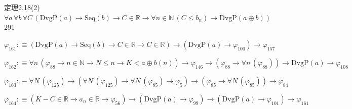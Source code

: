 \begin{fullproof}{定理2.18(2)}{$\forall a\,\forall b\,\forall C\,(\mathrm{DvgP}(a) \to \mathrm{Seq}(b) \to C \in \mathbb{R} \to \forall n \in \mathbb{N}\,(C \leq b_{n}) \to \mathrm{DvgP}(a \oplus b))$}{291}
\begin{abbrevlist}
\item $\varphi_{161} :\equiv (\mathrm{DvgP}(a) \to \mathrm{Seq}(b) \to C \in \mathbb{R} \to C \in \mathbb{R}) \to (\mathrm{DvgP}(a) \to \varphi_{100}) \to \varphi_{157}$
\item $\varphi_{162} :\equiv \forall n\,(\varphi_{88} \to n \in \mathbb{N} \to N \leq n \to K < a \oplus b(n)) \to \varphi_{146} \to (\varphi_{88} \to \forall n\,(\varphi_{88})) \to \mathrm{DvgP}(a) \to \varphi_{108}$
\item $\varphi_{163} :\equiv \forall N\,(\varphi_{125}) \to (\forall N\,(\varphi_{125}) \to \forall N\,(\varphi_{85}) \to \varphi_{5}) \to (\varphi_{85} \to \forall N\,(\varphi_{85})) \to \varphi_{84}$
\item $\varphi_{164} :\equiv (K - C \in \mathbb{R} \to a_{n} \in \mathbb{R} \to \varphi_{56}) \to (\mathrm{DvgP}(a) \to \varphi_{99}) \to (\mathrm{DvgP}(a) \to \varphi_{101}) \to \varphi_{161}$
\end{abbrevlist}
\end{fullproof}
